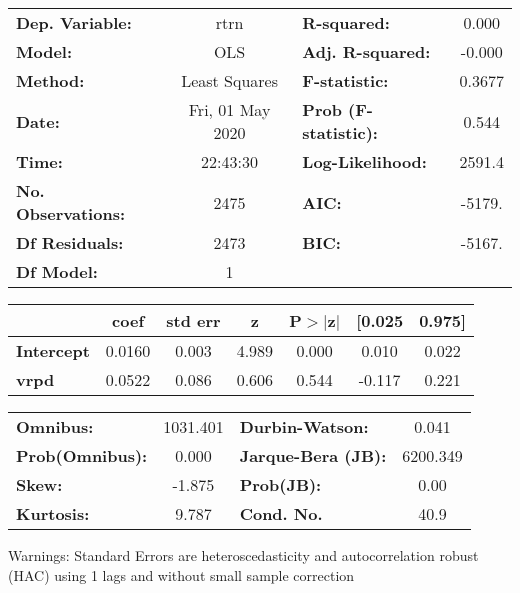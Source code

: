 \begin{center}
\begin{tabular}{lclc}
\toprule
\textbf{Dep. Variable:}    &       rtrn       & \textbf{  R-squared:         } &     0.000   \\
\textbf{Model:}            &       OLS        & \textbf{  Adj. R-squared:    } &    -0.000   \\
\textbf{Method:}           &  Least Squares   & \textbf{  F-statistic:       } &    0.3677   \\
\textbf{Date:}             & Fri, 01 May 2020 & \textbf{  Prob (F-statistic):} &    0.544    \\
\textbf{Time:}             &     22:43:30     & \textbf{  Log-Likelihood:    } &    2591.4   \\
\textbf{No. Observations:} &        2475      & \textbf{  AIC:               } &    -5179.   \\
\textbf{Df Residuals:}     &        2473      & \textbf{  BIC:               } &    -5167.   \\
\textbf{Df Model:}         &           1      & \textbf{                     } &             \\
\bottomrule
\end{tabular}
\begin{tabular}{lcccccc}
                   & \textbf{coef} & \textbf{std err} & \textbf{z} & \textbf{P$> |$z$|$} & \textbf{[0.025} & \textbf{0.975]}  \\
\midrule
\textbf{Intercept} &       0.0160  &        0.003     &     4.989  &         0.000        &        0.010    &        0.022     \\
\textbf{vrpd}      &       0.0522  &        0.086     &     0.606  &         0.544        &       -0.117    &        0.221     \\
\bottomrule
\end{tabular}
\begin{tabular}{lclc}
\textbf{Omnibus:}       & 1031.401 & \textbf{  Durbin-Watson:     } &    0.041  \\
\textbf{Prob(Omnibus):} &   0.000  & \textbf{  Jarque-Bera (JB):  } & 6200.349  \\
\textbf{Skew:}          &  -1.875  & \textbf{  Prob(JB):          } &     0.00  \\
\textbf{Kurtosis:}      &   9.787  & \textbf{  Cond. No.          } &     40.9  \\
\bottomrule
\end{tabular}
\end{center}

Warnings: \newline
 [1] Standard Errors are heteroscedasticity and autocorrelation robust (HAC) using 1 lags and without small sample correction